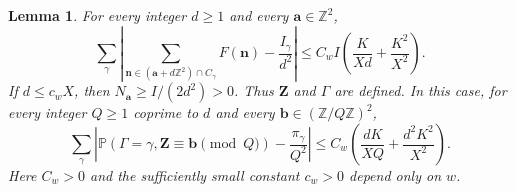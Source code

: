 \documentclass[twoside]{aomart}
\theoremstyle{paperplain}
\newtheorem{lemma}[theorem]{Lemma}
\theoremstyle{paperdefinition}
\newcommand{\Z}{\mathbb Z}
\newcommand{\Pp}{\mathbb P}
\numberwithin{equation}{section}
\begin{document}
\begin{lemma}
\label{ar:spatial-quadrature}
For every integer $d\ge1$ and every $\mathbf a\in\Z^2$,
\begin{equation}
 \sum_\gamma\left|
 \sum_{\mathbf n\in(\mathbf a+d\Z^2)\cap C_\gamma}F(\mathbf n)
             -\frac{I_\gamma}{d^2}\right|
 \le C_w I\left(\frac K{Xd}+\frac{K^2}{X^2}\right).
 \label{ar:partition-quadrature}
\end{equation}
If $d\le c_wX$, then $N_{\mathbf a}\ge I/(2d^2)>0$.
Thus $\mathbf Z$ and $\Gamma$ are defined.
In this case, for every integer $Q\ge1$ coprime to $d$
and every $\mathbf b\in(\Z/Q\Z)^2$,
\begin{equation}
 \sum_\gamma\left|
 \Pp(\Gamma=\gamma,\mathbf Z\equiv\mathbf b\pmod Q)
                  -\frac{\pi_\gamma}{Q^2}\right|
 \le C_w\left(\frac{dK}{XQ}+\frac{d^2K^2}{X^2}\right).
 \label{ar:spatial-residue-discrepancy}
\end{equation}
Here $C_w>0$ and the sufficiently small constant $c_w>0$
depend only on $w$.
\end{lemma}
\end{document}
